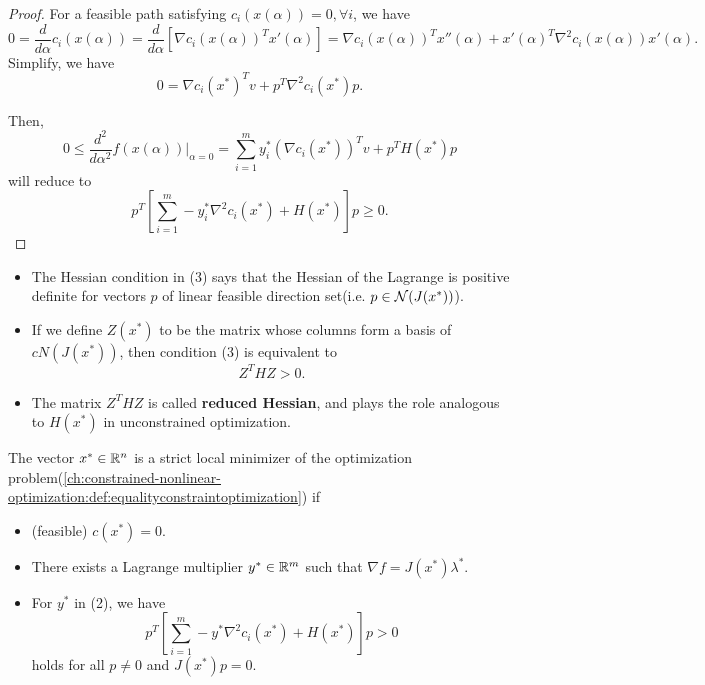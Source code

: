\begin{refsection}
\begin{proof}
For a feasible path satisfying $c_i(x(\alpha)) = 0,\forall i$, we have
$$0 = \frac{d}{d\alpha}c_i(x(\alpha)) = \frac{d}{d\alpha}[\nabla c_i(x(\alpha))^Tx'(\alpha)] = \nabla c_i(x(\alpha))^Tx''(\alpha) + x'(\alpha)^T\nabla^2 c_i(x(\alpha)) x'(\alpha).$$
Simplify, we have
$$0 = \nabla c_i(x^*)^T v + p^T\nabla^2 c_i(x^*)p.$$

Then, $$ 0 \leq \frac{d^2}{d\alpha^2}f(x(\alpha))|_{\alpha = 0}  = \sum_{i=1}^m y_i^*(\nabla c_i(x^*))^Tv + p^TH(x^*)p$$
will reduce to 
$$ p^T[\sum_{i=1}^m -y_i^* \nabla^2 c_i(x^*) + H(x^*)]p \geq 0.$$
\end{proof}



\begin{remark}\hfill {}
\begin{itemize}
	\item The Hessian condition in (3) says that the Hessian of the Lagrange is positive definite for vectors $p$ of linear feasible direction set(i.e. $p\in \mathcal{N}(J(x^*))$).
	\item If we define $Z(x^*)$ to be the matrix whose columns form a basis of $cN(J(x^*))$, then condition (3) is equivalent to 
	$$Z^THZ > 0.$$
	\item The matrix $Z^THZ$ is called \textbf{reduced Hessian}, and plays the role analogous to $H(x^*)$ in unconstrained optimization.
\end{itemize}
\end{remark}


\begin{theorem}
\label{ch:constrained-nonlinear-optimization:th:secondorderKKTequalitysufficient}\cite[lec 4]{Robinson2015nonlinear2}\cite[364]{bertsekas2016nonlinear}
The vector $x^*\in \mathbb{R}^n$ is a strict local minimizer of the optimization problem(\autoref{ch:constrained-nonlinear-optimization:def:equalityconstraintoptimization}) if
\begin{itemize}
	\item (feasible) $c(x^*) = 0$.
	\item There exists a Lagrange multiplier $y^*\in \mathbb{R}^m$ such that $\nabla f = J(x^*)\lambda^*$.
	\item For $y^*$ in (2), we have
	$$p^T[\sum_{i=1}^m -y^* \nabla^2 c_i(x^*) + H(x^*)]p > 0$$
	holds for all $p\neq 0$ and $J(x^*)p = 0.$  
\end{itemize}


\end{theorem}
\end{refsection}
